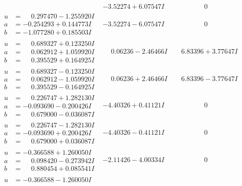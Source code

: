 \documentclass[1p]{elsarticle_modified}
\theoremstyle{definition}
\begin{document}
$$\begin{array}{c|c|c}
 & -3.52274 + 6.07547 I & \phantom{-0.000000 } 0 \\ \hline\begin{aligned}
u &= \phantom{-}0.297470 - 1.255920 I \\
a &= -0.254293 + 0.144773 I \\
b &= -1.077280 + 0.185503 I\end{aligned}
 & -3.52274 - 6.07547 I & \phantom{-0.000000 } 0 \\ \hline\begin{aligned}
u &= \phantom{-}0.689327 + 0.123250 I \\
a &= \phantom{-}0.062912 + 1.059920 I \\
b &= \phantom{-}0.395529 + 0.164925 I\end{aligned}
 & \phantom{-}0.06236 - 2.46466 I & \phantom{-}6.83396 + 3.77647 I \\ \hline\begin{aligned}
u &= \phantom{-}0.689327 - 0.123250 I \\
a &= \phantom{-}0.062912 - 1.059920 I \\
b &= \phantom{-}0.395529 - 0.164925 I\end{aligned}
 & \phantom{-}0.06236 + 2.46466 I & \phantom{-}6.83396 - 3.77647 I \\ \hline\begin{aligned}
u &= \phantom{-}0.226747 + 1.282130 I \\
a &= -0.093690 - 0.200426 I \\
b &= \phantom{-}0.679000 - 0.036087 I\end{aligned}
 & -4.40326 + 0.41121 I & \phantom{-0.000000 } 0 \\ \hline\begin{aligned}
u &= \phantom{-}0.226747 - 1.282130 I \\
a &= -0.093690 + 0.200426 I \\
b &= \phantom{-}0.679000 + 0.036087 I\end{aligned}
 & -4.40326 - 0.41121 I & \phantom{-0.000000 } 0 \\ \hline\begin{aligned}
u &= -0.366588 + 1.260050 I \\
a &= \phantom{-}0.098420 - 0.273942 I \\
b &= \phantom{-}0.880454 + 0.085541 I\end{aligned}
 & -2.11426 - 4.00334 I & \phantom{-0.000000 } 0 \\ \hline\begin{aligned}
u &= -0.366588 - 1.260050 I \\

\end{aligned}
\end{array}$$
\end{document}
